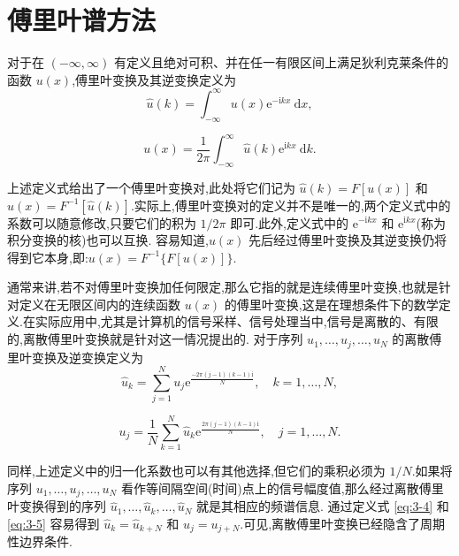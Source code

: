 \section{傅里叶谱方法}

对于在 $(-\infty, \infty)$ 有定义且绝对可积、并在任一有限区间上满足狄利克莱条件的函数 $u(x)$,傅里叶变换及其逆变换定义为
\begin{equation}
    \hat{u}(k) = \int_{-\infty}^{\infty} u(x) \mathrm{e}^{-\mathrm{i} k x} \mathrm{~d} x, \label{eq:3-1}
\end{equation}

\begin{equation}
    u(x) = \frac{1}{2 \pi} \int_{-\infty}^{\infty} \hat{u}(k) \mathrm{e}^{\mathrm{i} k x} \mathrm{~d} k. \label{eq:3-2}
\end{equation}

上述定义式给出了一个傅里叶变换对,此处将它们记为 $\hat{u}(k) = F[u(x)]$ 和 $u(x) = F^{-1}[\hat{u}(k)]$.实际上,傅里叶变换对的定义并不是唯一的,两个定义式中的系数可以随意修改,只要它们的积为 $1 / 2 \pi$ 即可.此外,定义式中的 $\mathrm{e}^{-\mathrm{i} k x}$ 和 $\mathrm{e}^{\mathrm{i} k x}$(称为积分变换的核)也可以互换.
容易知道,$u(x)$ 先后经过傅里叶变换及其逆变换仍将得到它本身,即:$u(x) = F^{-1}\{F[u(x)]\}$.

通常来讲,若不对傅里叶变换加任何限定,那么它指的就是连续傅里叶变换,也就是针对定义在无限区间内的连续函数 $u(x)$ 的傅里叶变换,这是在理想条件下的数学定义.在实际应用中,尤其是计算机的信号采样、信号处理当中,信号是离散的、有限的,离散傅里叶变换就是针对这一情况提出的.
对于序列 $u_1, \ldots, u_j, \ldots, u_N$ 的离散傅里叶变换及逆变换定义为\cite{ZhangXiaoMatlabWeiFenFangChengGaoXiaoJieFaPuFangFaYuanLiYuShiXian2015}
\begin{equation}
    \hat{u}_k = \sum_{j=1}^N u_j \mathrm{e}^{\frac{-2 \pi(j-1)(k-1) \mathrm{i}}{N}}, \quad k=1, \ldots, N, \label{eq:3-4}
\end{equation}

\begin{equation}
    u_j = \frac{1}{N} \sum_{k=1}^N \hat{u}_k \mathrm{e}^{\frac{2 \pi(j-1)(k-1) \mathrm{i}}{N}}, \quad j=1, \ldots, N. \label{eq:3-5}
\end{equation}

同样,上述定义中的归一化系数也可以有其他选择,但它们的乘积必须为 $1 / N$.如果将序列 $u_1, \ldots, u_j, \ldots, u_N$ 看作等间隔空间(时间)点上的信号幅度值,那么经过离散傅里叶变换得到的序列 $\hat{u}_1, \ldots, \hat{u}_k, \ldots, \hat{u}_N$ 就是其相应的频谱信息.
通过定义式 \eqref{eq:3-4} 和 \eqref{eq:3-5} 容易得到 $\hat{u}_k = \hat{u}_{k+N}$ 和 $u_j = u_{j+N}$.可见,离散傅里叶变换已经隐含了周期性边界条件.

